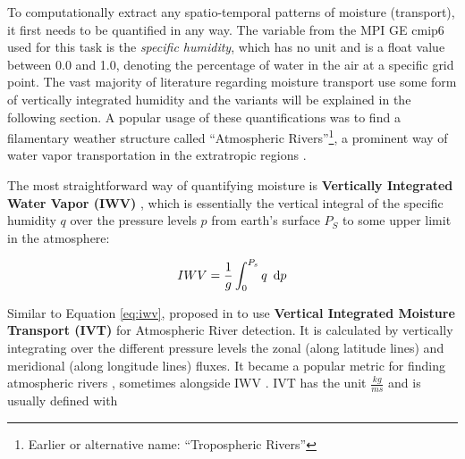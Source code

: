 To computationally extract any spatio-temporal patterns of moisture (transport), it first needs to be quantified in any way.
The variable from the MPI GE \ac{cmip}6 used for this task is the \textit{specific humidity}, which has no unit and is a float value between 0.0 and 1.0, denoting the percentage of water in the air at a specific grid point. 
The vast majority of literature regarding moisture transport use some form of vertically integrated humidity and the variants will be explained in the following section.  
A popular usage of these quantifications was to find a filamentary weather structure called \enquote{Atmospheric Rivers}\footnote{Earlier or alternative name: \enquote{Tropospheric Rivers}}, a prominent way of water vapor transportation in the extratropic regions \cite{gimeno_atmospheric_2014}. 


The most straightforward way of quantifying moisture is \textbf{Vertically Integrated Water Vapor (IWV)} \cite{gimeno_atmospheric_2014, schluessel_atmospheric_1990, bao_interpretation_2006, neiman_meteorological_2008, zhao_lagrangian_2021}, which is essentially the vertical integral of the specific humidity $q$ over the pressure levels $p$ from earth's surface $P_S$ to some upper limit in the atmosphere:


\begin{equation}
\label{eq:iwv}
IWV = \frac{1}{g} \int^{P_s}_0 q ~\operatorname{d}\!{p}
\end{equation}






Similar to Equation \ref{eq:iwv},  \citeauthor{zhu_proposed_1998} proposed in \cite{zhu_proposed_1998} to use \textbf{Vertical Integrated Moisture Transport (IVT)} for Atmospheric River detection. 
It is calculated by vertically integrating over the different pressure levels the zonal (along latitude lines) and meridional (along longitude lines) fluxes.
It became a popular metric for finding atmospheric rivers \cite{gimeno_atmospheric_2014}, sometimes alongside IWV \cite{eiras-barca_seasonal_2016}.
IVT has the unit $\frac{kg}{ms}$ and is usually defined with

